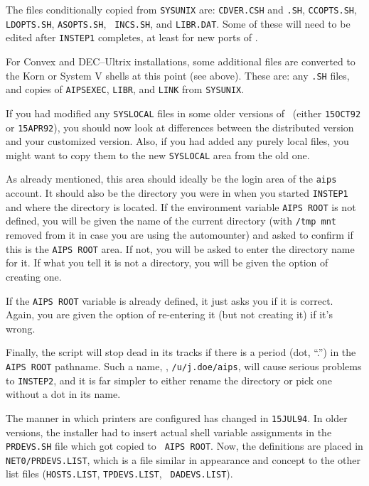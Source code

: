 The files conditionally copied from {\tt SYSUNIX} are: {\tt CDVER.CSH}
and {\tt .SH}, {\tt CCOPTS.SH}, {\tt LDOPTS.SH}, {\tt ASOPTS.SH}, {\tt
INCS.SH}, and {\tt LIBR.DAT}.  Some of these will need to be edited
after {\tt INSTEP1} completes, at least for new ports of \AIPS.

For Convex and DEC--Ultrix installations, some additional files are
converted to the Korn or System V shells at this point (see above).  These
are: any {\tt *.SH} files, and copies of {\tt AIPSEXEC}, {\tt LIBR}, and
{\tt LINK} from {\tt \dol SYSUNIX}.

If you had modified any {\tt\dol SYSLOCAL} files in some older versions of
\AIPS\ (either {\tt 15OCT92} or {\tt 15APR92}), you should now look at
differences between the distributed version and your customized version.
Also, if you had added any purely local files, you might want to copy them
to the new {\tt\dol SYSLOCAL} area from the old one.

\medskip{}

As already mentioned, this area should ideally be the login area of the
{\tt aips} account.  It should also be the directory you were in when you
started {\tt INSTEP1} and where the {\tt\thisver} directory is located.
If the environment variable {\tt AIPS ROOT} is not defined, you
will be given the name of the current directory (with {\tt /tmp
mnt} removed from it in case you are using the automounter) and asked to
confirm if this is the {\tt AIPS ROOT} area.  If not, you will be
asked to enter the directory name for it.  If what you tell it is not a
directory, you will be given the option of creating one.

If the {\tt AIPS ROOT} variable is already defined, it just asks you
if it is correct.  Again, you are given the option of re-entering it
(but not creating it) if it's wrong.

Finally, the script will stop dead in its tracks if there is a period
(dot, ``.'') in the {\tt\dol AIPS ROOT} pathname.  Such a name,
\eg, {\tt /u/j.doe/aips}, will cause serious problems to {\tt INSTEP2}, and
it is far simpler to either rename the directory or pick one without a dot
in its name.

\medskip{}


The manner in which printers are configured has changed in {\tt 15JUL94}.
In older versions, the installer had to insert actual shell variable
assignments in the {\tt PRDEVS.SH} file which got copied to {\tt\dol
AIPS ROOT}.  Now, the definitions are placed in {\tt\dol
NET0/PRDEVS.LIST}, which is a file similar in appearance and concept to
the other list files ({\tt HOSTS.LIST}, {\tt TPDEVS.LIST}, {\tt
DADEVS.LIST}).

